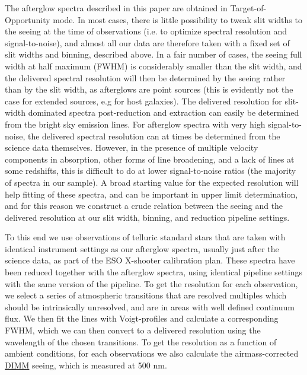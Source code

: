 \documentclass[longauth]{aa}    %
\begin{document}
The afterglow spectra described in this paper are obtained in
Target-of-Opportunity mode. In most cases, there is little possibility to tweak
slit widths to the seeing at the time of observations (i.e. to optimize spectral
resolution and signal-to-noise), and almost all our data are therefore taken
with a fixed set of slit widths and binning, described above. In a fair number
of cases, the seeing full width at half maximum (FWHM) is considerably smaller
than the slit width, and the delivered spectral resolution will then be
determined by the seeing rather than by the slit width, as afterglows are point
sources (this is evidently not the case for extended sources, e.g for host
galaxies). The delivered resolution for slit-width dominated spectra
post-reduction and extraction can easily be determined from the bright sky
emission lines. For afterglow spectra with very high signal-to-noise, the
delivered spectral resolution can at times be determined from the science data
themselves. However, in the presence of multiple velocity components in
absorption, other forms of line broadening, and a lack of lines at some
redshifts, this is difficult to do at lower signal-to-noise ratios (the majority
of spectra in our sample). A broad starting value for the expected resolution
will help fitting of these spectra, and can be important in upper limit
determination, and for this reason we construct a crude relation between the
seeing and the delivered resolution at our slit width, binning, and reduction
pipeline settings.

To this end we use observations of telluric standard stars that are taken with
identical instrument settings as our afterglow spectra, usually just after the
science data, as part of the ESO X-shooter calibration plan. These spectra have
been reduced together with the afterglow spectra, using identical pipeline
settings with the same version of the pipeline. To get the resolution for each
observation, we select a series of atmospheric transitions that are resolved
multiples which should be intrinsically unresolved, and are in areas with well
defined continuum flux. We then fit the lines with Voigt-profiles and calculate
a corresponding FWHM, which we can then convert to a delivered resolution using
the wavelength of the chosen transitions. To get the resolution as a function of
ambient conditions, for each observations we also calculate the
airmass-corrected \href{http://www.eso.org/asm/ui/publicLog}{DIMM} seeing, which
is measured at 500 nm.
\end{document}
